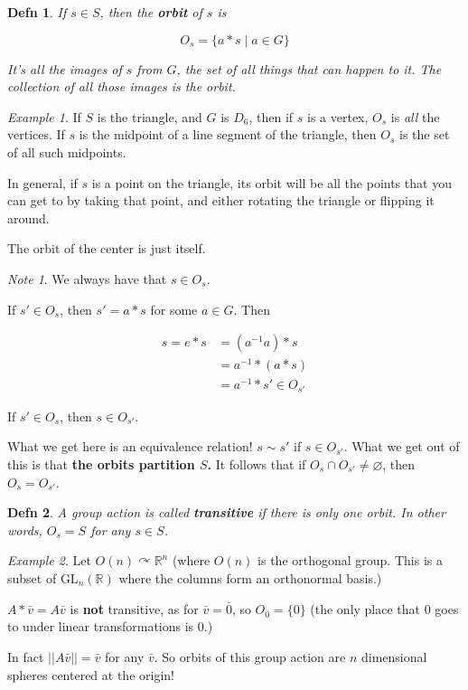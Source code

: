 \documentclass[12pt]{article}
\def\acts{\curvearrowright} %
\def\gl{\text{GL}}
\def\R{{\mathbb R}}
\newtheorem{definition}{Defn}
\theoremstyle{remark}
\theoremstyle{remark}
\theoremstyle{remark}
\newtheorem{example}{Example}
\theoremstyle{remark}
\theoremstyle{remark}
\newtheorem*{note}{Note}
\begin{document}
\begin{definition}
  If $s \in S$, then the {\bf orbit} of $s$ is

  \[
    O_s = \{ a * s \mid a \in G \}
  \]

  It's all the images of $s$ from $G$, the set of all things that can happen to
  it. The collection of all those images is the orbit.
\end{definition}

\begin{example}
  If $S$ is the triangle, and $G$ is $D_6$, then if $s$ is a vertex, $O_s$ is
  {\it all} the vertices. If $s$ is the midpoint of a line segment of the
  triangle, then $O_s$ is the set of all such midpoints.

  In general, if $s$ is a point on the triangle, its orbit will be all the
  points that you can get to by taking that point, and either rotating the
  triangle or flipping it around.

  The orbit of the center is just itself.
\end{example}

\begin{note}
  We always have that $s \in O_s$.
\end{note}

If $s' \in O_s$, then $s' = a * s$ for some $a \in G$. Then

\begin{align*}
  s = e * s &= (a^{-1}a) * s \\
            &= a^{-1} * (a * s) \\
            &= a^{-1} * s' \in O_{s'}
\end{align*}

If $s' \in O_s$, then $s \in O_{s'}$.

What we get here is an equivalence relation! $s \sim s'$ if $s \in O_{s'}$. What
we get out of this is that {\bf the orbits partition $S$.} It follows that if
$O_s \cap O_{s'} \ne \varnothing$, then $O_s = O_{s'}$.

\begin{definition}
  A group action is called {\bf transitive} if there is only one orbit. In other
  words, $O_s = S$ for any $s \in S$.
\end{definition}

\begin{example}
  Let $O(n) \acts \R^n$ (where $O(n)$ is the orthogonal group. This is a
  subset of $\gl_n(\R)$ where the columns form an orthonormal basis.)

  $A * \bar v = A \bar v$ is {\bf not} transitive, as for $\bar v = \bar 0$, so
  $O_{\bar 0} = \{0\}$ (the only place that $0$ goes to under linear
  transformations is $0$.)

  In fact $||A \bar v|| = \bar v$ for any $\bar v$. So orbits of this group
  action are $n$ dimensional spheres centered at the origin!
\end{example}
\end{document}
